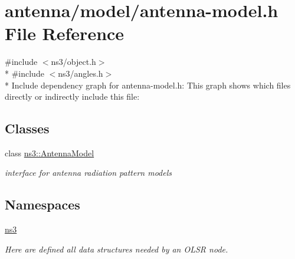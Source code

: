 \hypertarget{antenna-model_8h}{}\section{antenna/model/antenna-\/model.h File Reference}
\label{antenna-model_8h}
{\ttfamily \#include $<$ns3/object.\+h$>$}\\*
{\ttfamily \#include $<$ns3/angles.\+h$>$}\\*
Include dependency graph for antenna-\/model.h\+:
This graph shows which files directly or indirectly include this file\+:
\subsection*{Classes}
\begin{DoxyCompactItemize}
\item 
class \hyperlink{classns3_1_1AntennaModel}{ns3\+::\+Antenna\+Model}
\begin{DoxyCompactList}\small\item\em interface for antenna radiation pattern models \end{DoxyCompactList}\end{DoxyCompactItemize}
\subsection*{Namespaces}
\begin{DoxyCompactItemize}
\item 
 \hyperlink{namespacens3}{ns3}
\begin{DoxyCompactList}\small\item\em Here are defined all data structures needed by an O\+L\+SR node. \end{DoxyCompactList}\end{DoxyCompactItemize}
